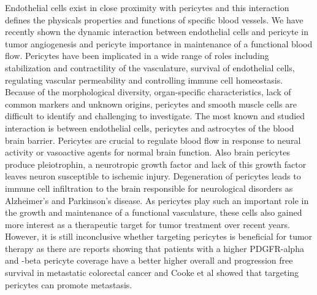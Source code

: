 Endothelial cells exist in close proximity with pericytes and this interaction defines the physicals properties and functions of specific blood vessels. We have recently shown the dynamic interaction between endothelial cells and pericyte in tumor angiogenesis and pericyte importance in maintenance of a functional blood flow\cite{Seynhaeve_2018,Seynhaeve_2021}. Pericytes have been implicated in a wide range of roles including stabilization and contractility of the vasculature, survival of endothelial cells, regulating vascular permeability and controlling immune cell homeostasis\cite{T_r_k_2021,Kaushik_2021}. Because of the morphological diversity, organ-specific characteristics, lack of common markers and unknown origins, pericytes and smooth muscle cells are difficult to identify\cite{Muhl_2020} and challenging to investigate. The most known and studied interaction is between endothelial cells, pericytes and astrocytes of the blood brain barrier\cite{Netzahualcoyotzi_2024}. Pericytes are crucial to regulate blood flow in response to neural activity or vasoactive agents for normal brain function. Also brain pericytes produce pleiotrophin, a neurotropic growth factor and lack of this growth factor leaves neuron susceptible to ischemic injury\cite{Nikolakopoulou_2019}. Degeneration of pericytes leads to immune cell infiltration to the brain responsible for neurological disorders as Alzheimer's and Parkinson's disease. As pericytes play such an important role in the growth and maintenance of a functional vasculature, these cells also gained more interest as a therapeutic target for tumor treatment over recent years. However, it is still inconclusive whether targeting pericytes is beneficial for tumor therapy as there are reports showing that patients with a higher PDGFR-alpha and -beta pericyte coverage have a better higher overall and progression free survival in metastatic colorectal cancer\cite{Mezheyeuski_2016} and Cooke et al showed that targeting pericytes can promote metastasis\cite{Cooke_2012}.

